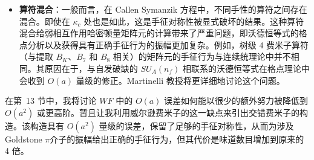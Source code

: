 \begin{itemize}
\item \textbf{算符混合}：一般而言，在 Callen Symanzik 方程中，不同手性的算符之间存在混合。即使在 $\kappa_c$ 处也是如此，这是手征对称性被显式破坏的结果。这种算符混合给弱相互作用哈密顿量矩阵元的计算带来了严重问题，即沃德恒等式的格点分析以及获得具有正确手征行为的振幅更加复杂。例如，树级 4 费米子算符（与提取 $B_K$、$B_7$ 和 $B_8$ 相关）的矩阵元的手征行为与连续统理论中并不相同。其原因在于，与自发破缺的 $SU_A(n_f)$ 相联系的沃德恒等式在格点理论中会收到 $O(a)$ 量级的修正。Martinelli 教授将更详细地讨论这个问题。
\end{itemize}

在第~13 节中，我将讨论 $WF$ 中的 $O(a)$ 误差如何能以很少的额外努力被降低到 $O(a^2)$ 或更高阶。暂且让我利用威尔逊费米子的这一缺点来引出交错费米子的构造。该构造具有 $O(a^2)$ 量级的误差，保留了足够的手征对称性，从而为涉及 Goldstone $\pi$介子的振幅给出正确的手征行为，但其代价是味道数目增加到原来的 4 倍。
